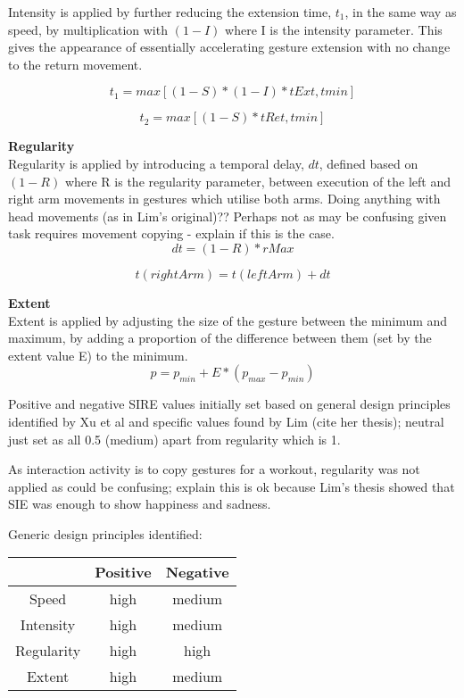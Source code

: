 \documentclass[11pt,a4paper]{report}
\begin{document}
Intensity is applied by further reducing the extension time, $t_{1}$, in the same way as speed, by multiplication with $(1-I)$ where I is the intensity parameter. This gives the appearance of essentially accelerating gesture extension with no change to the return movement. 

\begin{equation}
t_{1} = max[(1-S)*(1-I)*tExt,tmin]
\end{equation}

\begin{equation}
t_{2} = max[(1-S)*tRet,tmin]
\end{equation}

\textbf{Regularity}
\\ Regularity is applied by introducing a temporal delay, $dt$, defined based on $(1-R)$ where R is the regularity parameter, between execution of the left and right arm movements in gestures which utilise both arms. Doing anything with head movements (as in Lim's original)?? Perhaps not as may be confusing given task requires movement copying - explain if this is the case.
\begin{equation}
dt = (1-R)*rMax
\end{equation}

\begin{equation}
t(rightArm) = t(leftArm) + dt
\end{equation}

\textbf{Extent}
\\Extent is applied by adjusting the size of the gesture between the minimum and maximum, by adding a proportion of the difference between them (set by the extent value E) to the minimum. 
\begin{equation}
p = p_{min} + E*(p_{max} - p_{min})
\end{equation}

Positive and negative SIRE values initially set based on general design principles identified by Xu et al \cite{xu2013mood} and specific values found by Lim (cite her thesis); neutral just set as all 0.5 (medium) apart from regularity which is 1.

As interaction activity is to copy gestures for a workout, regularity was not applied as could be confusing; explain this is ok because Lim's thesis showed that SIE was enough to show happiness and sadness. 

Generic design principles identified:

\begin{tabular}{|c|c|c|}
\hline & Positive & Negative \\ 
\hline Speed & high & medium \\ 
\hline Intensity & high & medium \\ 
\hline Regularity & high & high \\ 
\hline Extent & high & medium \\ 
\hline 
\end{tabular} 
\end{document}

